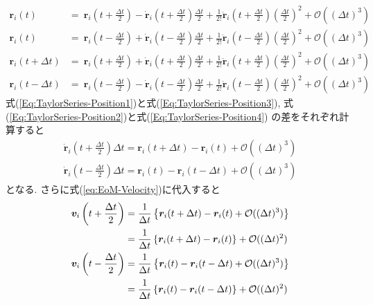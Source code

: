\begin{align}
 \bm{r}_{i} (t)
 &=~ 
     \bm{r}_{i} \left( t + \frac{\Delta t}{2} \right)
   - \dot{\bm{r}}_{i} \left( t + \frac{\Delta t}{2} \right)\frac{\Delta t}{2}
   + \frac{1}{2!} \ddot{\bm{r}}_{i} \left( t + \frac{\Delta t}{2} \right)
     \left( \frac{\Delta t}{2} \right)^{2}
   + \mathcal{O} ((\Delta t)^{3})
 \label{Eq:TaylorSeries-Position1} 
 \\
  \bm{r}_{i} (t)
 &=~ 
     \bm{r}_{i} \left( t - \frac{\Delta t}{2} \right)
   + \dot{\bm{r}}_{i} \left( t - \frac{\Delta t}{2} \right) \frac{\Delta t}{2}
   + \frac{1}{2!} \ddot{\bm{r}}_{i} \left( t - \frac{\Delta t}{2} \right)
     \left( \frac{\Delta t}{2} \right)^{2}
   + \mathcal{O} ((\Delta t)^{3})
 \label{Eq:TaylorSeries-Position2}
 \\
   \bm{r}_{i} (t + \Delta t)
 &=~ 
    \bm{r}_{i} \left( t + \frac{\Delta t}{2} \right)
 + \dot{\bm{r}}_{i}
   \left( t + \frac{\Delta t}{2} \right) \frac{\Delta t}{2}
 + \frac{1}{2!} \ddot{\bm{r}}_{i} \left( t + \frac{\Delta t}{2} \right)
   \left( \frac{\Delta t}{2} \right)^{2}
 + \mathcal{O} ((\Delta t)^{3})
 \label{Eq:TaylorSeries-Position3} 
 \\
  \bm{r}_{i} (t - \Delta t)
 &=~
     \bm{r}_{i} \left( t - \frac{\Delta t}{2} \right)
   - \dot{\bm{r}}_{i} \left( t - \frac{\Delta t}{2} \right)\frac{\Delta t}{2}
   + \frac{1}{2!} \ddot{\bm{r}}_{i} \left( t - \frac{\Delta t}{2} \right)
     \left( \frac{\Delta t}{2} \right)^{2}
   + \mathcal{O} ((\Delta t)^{3})
 \label{Eq:TaylorSeries-Position4}
\end{align}
式(\ref{Eq:TaylorSeries-Position1})と式(\ref{Eq:TaylorSeries-Position3}),
式(\ref{Eq:TaylorSeries-Position2})と式(\ref{Eq:TaylorSeries-Position4})
の差をそれぞれ計算すると
\begin{align}
  \dot{\bm{r}}_{i} \left( t + \frac{\Delta t}{2} \right) \Delta t
= \bm{r}_{i} (t + \Delta t) - \bm{r}_{i}(t)
+ \mathcal{O}((\Delta t)^{3})
  \label{Eq:diff_Position1}
  \\
  \dot{\bm{r}}_{i} \left( t - \frac{\Delta t}{2} \right) \Delta t 
= \bm{r}_{i} (t) - \bm{r}_{i}(t - \Delta t)
+ \mathcal{O}((\Delta t)^{3})
  \label{Eq:diff_Position2}
\end{align}
となる. さらに式(\ref{eq:EoM-Velocity})に代入すると
\begin{align}
 \bm{v}_{i} \left(t + \frac{\Delta t}{2} \right)
&=
 \frac{1}{\Delta t}
 \left\{
        \bm{r}_{i}(t + \Delta t) - \bm{r}_{i}(t) + \mathcal{O}((\Delta t)^{3})
 \right\}
 \notag
 \\
&=
 \frac{1}{\Delta t}
 \left\{
        \bm{r}_{i}(t + \Delta t) - \bm{r}_{i}(t)
 \right\}
 + \mathcal{O}((\Delta t)^{2})
 \label{Eq:Velocity2}
 \\
 \bm{v}_{i} \left(t - \frac{\Delta t}{2} \right)
 &=
 \frac{1}{\Delta t}
 \left\{
        \bm{r}_{i}(t) - \bm{r}_{i}(t - \Delta t)  + \mathcal{O}((\Delta t)^{3})
 \right\}
 \notag
 \\
 &=
 \frac{1}{\Delta t}
 \left\{
        \bm{r}_{i}(t) - \bm{r}_{i}(t - \Delta t)
 \right\}
 + \mathcal{O}((\Delta t)^{2})
 \label{Eq:Velocity3}
\end{align}
